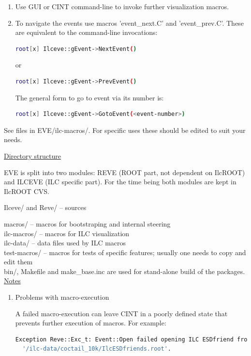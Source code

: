 \documentclass[12pt,a4paper,twoside]{article}
\begin{document}
{\begin{enumerate}
\item Use GUI or CINT command-line to invoke further visualization macros.
\item To navigate the events use macros 'event\_next.C' and 'event\_prev.C'.
   These are equivalent to the command-line invocations:
\begin{lstlisting}[language=sh]
   root[x] Ilceve::gEvent->NextEvent()
\end{lstlisting}
or
\begin{lstlisting}[language=sh]
   root[x] Ilceve::gEvent->PrevEvent()
\end{lstlisting}
The general form to go to event via its number is:
\begin{lstlisting}[language=sh]
   root[x] Ilceve::gEvent->GotoEvent(<event-number>)
\end{lstlisting}
\end{enumerate}

See files in EVE/ilc-macros/. For specific uses these should be
edited to suit your needs.

\underline{Directory structure}

EVE is split into two modules: REVE (ROOT part, not dependent on
IlcROOT) and ILCEVE (ILC specific part). For the time being both
modules are kept in IlcROOT CVS.

Ilceve/ and Reve/ -- sources

macros/		  -- macros for bootstraping and internal steering\\
ilc-macros/	  -- macros for ILC visualization\\
ilc-data/	  -- data files used by ILC macros\\
test-macros/      -- macros for tests of specific features; usually one needs
                     to copy and edit them\\
bin/, Makefile and make\_base.inc are used for stand-alone build of the
packages.\\

\underline{Notes}

\begin{enumerate}
\item Problems with macro-execution

A failed macro-execution can leave CINT in a poorly defined state that
prevents further execution of macros. For example:

\begin{lstlisting}[language=sh]
  Exception Reve::Exc_t: Event::Open failed opening ILC ESDfriend from
  '/ilc-data/coctail_10k/IlcESDfriends.root'.


\end{lstlisting}
\end{enumerate}}
\end{document}
